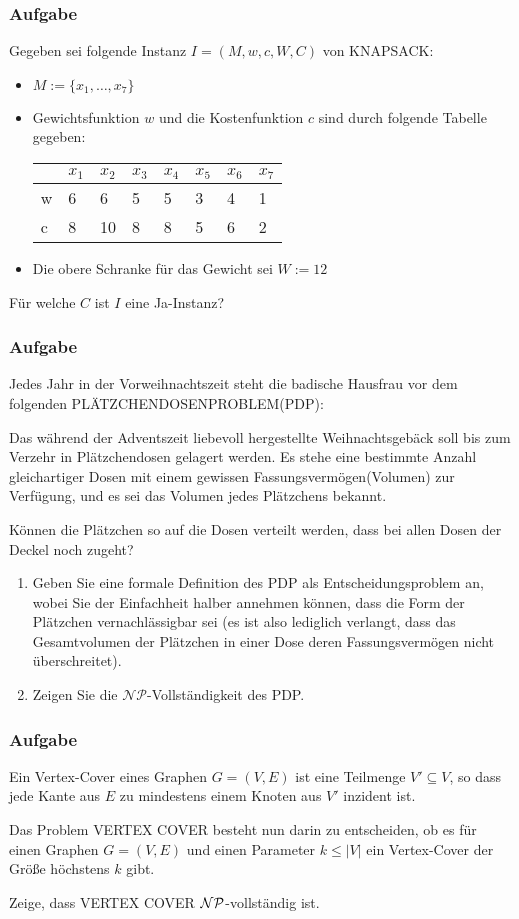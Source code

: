 \documentclass{beamer}
\begin{document}
\begin{frame}
\frametitle{Aufgabe}
Gegeben sei folgende Instanz $I=(M, w, c, W, C)$ von KNAPSACK:

\begin{itemize}
\item $M := \{x_1, \ldots, x_7\}$
\item Gewichtsfunktion $w$ und die Kostenfunktion $c$ sind durch folgende Tabelle gegeben:

\begin{center}
\begin{tabular}{l|l|l|l|l|l|l|l}
	  &$x_1$ &$x_2$ &$x_3$ 	&$x_4$ 	&$x_5$ 	&$x_6$ 	&$x_7$\\ 	
  \hline
	w &6	 &6	&5	&5	&3	&4	&1\\
  \hline
	c &8	 &10	&8	&8	&5	&6	&2\\
\end{tabular}
\end{center}
\item Die obere Schranke für das Gewicht sei $W:=12$
\end{itemize}

Für welche $C$ ist $I$ eine Ja-Instanz?  
\end{frame}

\begin{frame}
\frametitle{Aufgabe}
Jedes Jahr in der Vorweihnachtszeit steht die badische Hausfrau vor dem folgenden PLÄTZCHENDOSENPROBLEM(PDP):

\hspace{1cm}\parbox{0.8\textwidth}{Das während der Adventszeit liebevoll hergestellte Weihnachtsgebäck soll bis zum Verzehr in Plätzchendosen gelagert werden.
Es stehe eine bestimmte Anzahl gleichartiger Dosen mit einem gewissen Fassungsvermögen(Volumen) zur Verfügung, und es sei das Volumen jedes Plätzchens bekannt.

Können die Plätzchen so auf die Dosen verteilt werden, dass bei allen Dosen der Deckel noch zugeht?}
\begin{enumerate}
 \item Geben Sie eine formale Definition des PDP als Entscheidungsproblem an, wobei Sie der Einfachheit halber annehmen können, dass die Form der Plätzchen vernachlässigbar sei (es ist also lediglich verlangt, dass das Gesamtvolumen der Plätzchen in einer Dose deren Fassungsvermögen nicht überschreitet).
 \item Zeigen Sie die $\mathcal{NP}$-Vollständigkeit des PDP.
\end{enumerate}
\end{frame}
\begin{frame}
\frametitle{Aufgabe}
Ein Vertex-Cover eines Graphen $G=(V,E)$ ist eine Teilmenge $V'\subseteq V$, so
dass jede Kante aus $E$ zu mindestens einem Knoten aus $V'$ inzident ist.

Das Problem \textsc{VERTEX COVER} besteht nun darin zu entscheiden, ob es
für einen Graphen $G=(V,E)$ und einen Parameter $k \leq |V|$ ein Vertex-Cover
der Größe höchstens $k$ gibt.

Zeige, dass \textsc{VERTEX COVER} $\cal{NP}$-vollständig ist. 
\end{frame}
\end{document}
